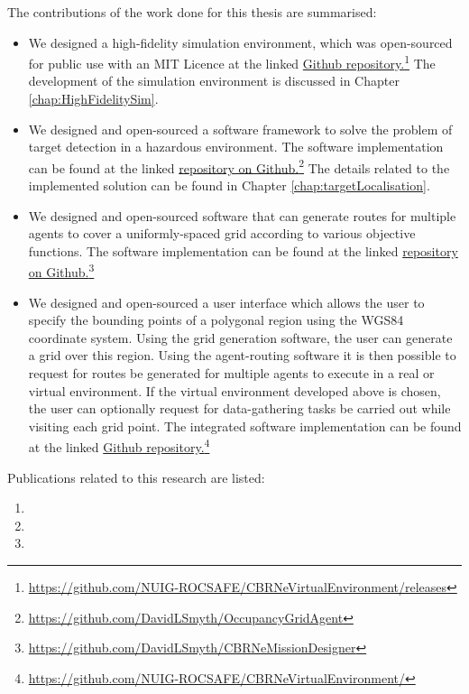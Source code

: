 The contributions of the work done for this thesis are summarised:
\begin{itemize}
    \item We designed a high-fidelity simulation environment, which was open-sourced for public use with an MIT Licence at the linked \href{https://github.com/NUIG-ROCSAFE/CBRNeVirtualEnvironment/releases}{Github repository.}\footnote{\href {https://github.com/NUIG-ROCSAFE/CBRNeVirtualEnvironment/releases}{https://github.com/NUIG-ROCSAFE/CBRNeVirtualEnvironment/releases}} The development of the simulation environment is discussed in Chapter \ref{chap:HighFidelitySim}.
    \item We designed and open-sourced a software framework to solve the problem of target detection in a hazardous environment. The software implementation can be found at the linked 
    \href{https://github.com/DavidLSmyth/OccupancyGridAgent}{repository on Github.}\footnote{\href {https://github.com/DavidLSmyth/OccupancyGridAgent}{https://github.com/DavidLSmyth/OccupancyGridAgent}} The details related to the implemented solution can be found in Chapter \ref{chap:targetLocalisation}.
    \item We designed and open-sourced software that can generate routes for multiple agents to cover a uniformly-spaced grid according to various objective functions. The software implementation can be found at the linked 
    \href{https://github.com/DavidLSmyth/CBRNeMissionDesigner}{repository on Github.}\footnote{\href {https://github.com/DavidLSmyth/CBRNeMissionDesigner}{https://github.com/DavidLSmyth/CBRNeMissionDesigner}}
    \item We designed and open-sourced a user interface which allows the user to specify the bounding points of a polygonal region using the WGS84 coordinate system. Using the grid generation  software, the user can generate a grid over this region. Using the agent-routing software it is then possible to request for routes be generated for multiple agents to execute in a real or virtual environment. If the virtual environment developed above is chosen, the user can optionally request for data-gathering tasks be carried out while visiting each grid point. The integrated software implementation can be found at the linked \href{https://github.com/NUIG-ROCSAFE/CBRNeVirtualEnvironment/}{Github repository.}\footnote{\href {https://github.com/NUIG-ROCSAFE/CBRNeVirtualEnvironment/}{https://github.com/NUIG-ROCSAFE/CBRNeVirtualEnvironment/}}
\end{itemize}

Publications related to this research are listed:
\begin{enumerate}
    \item {}
    \item {}
    \item {}

\end{enumerate}